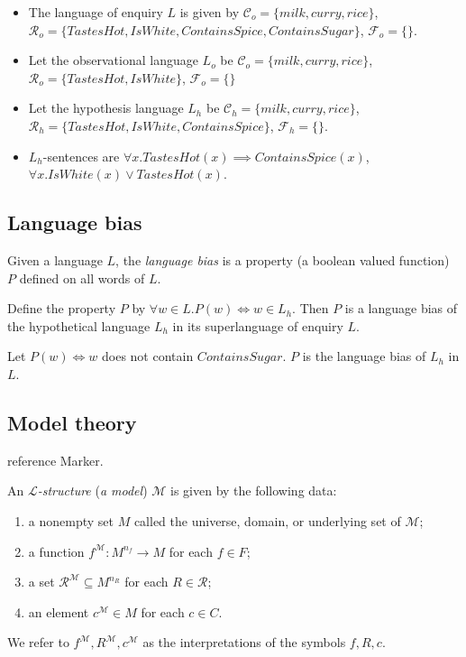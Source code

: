 \begin{exmp}
\begin{itemize}
\item The language of enquiry $L$ is given by $\mathcal{C}_o=\{milk, curry, rice\}$,$\mathcal{R}_o=\{TastesHot, IsWhite, ContainsSpice, ContainsSugar\}$, $\mathcal{F}_o=\{\}$.
\item Let the observational language $L_o$ be $\mathcal{C}_o=\{milk, curry, rice\}$,\\ $\mathcal{R}_o=\{TastesHot, IsWhite\}$, $\mathcal{F}_o=\{\}$
\item Let the hypothesis language $L_h$ be $\mathcal{C}_h=\{milk, curry, rice\}$,\\ $\mathcal{R}_h=\{TastesHot, IsWhite, ContainsSpice\}$, $\mathcal{F}_h=\{\}$.
\item $L_h$-sentences are $\forall x. TastesHot(x) \implies ContainsSpice(x)$,\\ $\forall x. IsWhite(x) \lor TastesHot(x)$.
\end{itemize}
\end{exmp}

\subsection{Language bias}
\begin{defn}
Given a language $L$, the \emph{language bias} is a property (a boolean valued function) $P$ defined on all words of $L$.
\end{defn}

\begin{exmp}
Define the property $P$ by $\forall w \in L. P(w) \iff w \in L_h$. Then $P$ is a language bias of the hypothetical language $L_h$ in its superlanguage of enquiry $L$.
\end{exmp}

\begin{exmp}
Let $P(w) \iff w$ does not contain $ContainsSugar$. $P$ is the language bias of $L_h$ in $L$.
\end{exmp}

\subsection{Model theory} reference Marker.

\begin{defn}
An \emph{$\mathcal{L}$-structure} (\emph{a model}) $\mathcal{M}$ is given by the following data:
\begin{enumerate}
\item a nonempty set $M$ called the universe, domain, or underlying set of $\mathcal{M}$;
\item a function $f^{\mathcal{M}} : M^{n_f} \to M$ for each $f \in F$;
\item a set $\mathcal{R}^{\mathcal{M}} \subseteq M^{n_R}$ for each $R \in \mathcal{R}$;
\item an element $c^\mathcal{M} \in M$ for each $c \in C$.
\end{enumerate}
We refer to $f^\mathcal{M}, R^\mathcal{M}, c^\mathcal{M}$ as the interpretations of the symbols $f ,R, c$.
\end{defn}

